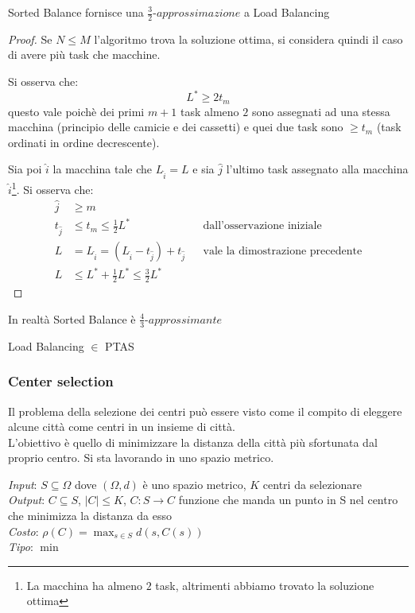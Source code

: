 \begin{theorem}
    Sorted Balance fornisce una $\frac{3}{2}\textit{-approssimazione}$  a Load Balancing
\end{theorem}
\begin{proof}
    Se $N\leq M$ l'algoritmo trova la soluzione ottima, si considera quindi il caso di 
    avere più task che macchine.
    
    Si osserva che: $$L^* \geq 2t_m$$ questo vale poichè dei primi $m+1$ task
    almeno $2$ sono assegnati ad una stessa macchina (principio delle camicie e dei 
    cassetti) e quei due task sono $\geq t_m$ (task ordinati in ordine decrescente).
    
    Sia poi $\hat{i}$ la macchina tale che $L_{\hat{i}} = L$ e sia 
    $\hat{j}$ l'ultimo task assegnato alla macchina $\hat{i}$\footnote{La macchina ha almeno $2$ task, 
    altrimenti abbiamo trovato la soluzione ottima}.
    Si osserva che: 
    \begin{equation}
        \begin{aligned}        
            \hat{j} &\geq m\\
            t_{\hat{j}} &\leq t_m  \leq \frac{1}{2}L^* && \text{dall'osservazione iniziale}\\
            L &= L_{\hat{i}} = (L_{\hat{i}} - t_{\hat{j}}) + t_{\hat{j}} && \text{vale la dimostrazione precedente}\\
            L &\leq L^* + \frac{1}{2}L^* \leq \frac{3}{2}L^*
        \end{aligned}
    \end{equation}
\end{proof}
\begin{remark}
    In realtà Sorted Balance è $\frac{4}{3}\textit{-approssimante}$
\end{remark}
\begin{remark}
    Load Balancing $\in$ PTAS
\end{remark}

\subsubsection{Center selection}
Il problema della selezione dei centri può essere visto come il compito 
di eleggere alcune città come centri in un insieme di città. 
\\L'obiettivo è quello di minimizzare la distanza della città più sfortunata
dal proprio centro. Si sta lavorando in uno spazio metrico.

\emph{Input}: $S \subseteq \Omega$ dove $(\Omega, d)$ è uno spazio metrico, $K$ centri da selezionare\\
\emph{Output}: $C \subseteq S$, $|C| \leq K$, $C : S \longrightarrow C$ funzione che manda 
un punto in S nel centro che minimizza la distanza da esso\\
\emph{Costo}: $\rho(C) = \max_{s \in S}d(s,C(s))$ \\
\emph{Tipo}: $\min$

